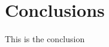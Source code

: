 \documentclass[../main.tex]{subfiles}
\begin{document}
\chapter{Conclusions}

This is the conclusion
\end{document}
